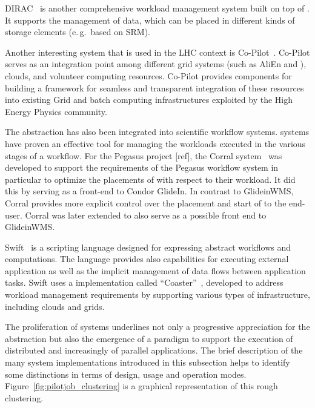 \documentclass{sig-alternate}
\begin{document}
DIRAC~\cite{1742-6596-219-6-062049} is another comprehensive workload management
system built on top of \pilots. It supports the management of data, which can be
placed in different kinds of storage elements (e.\,g.\ based on SRM).

Another interesting \pilot system that is used in the LHC context is
Co-Pilot~\cite{copilot-tr}. Co-Pilot serves as an integration point among
different grid \pilot systems (such as AliEn and \panda), clouds, and volunteer
computing resources. Co-Pilot provides components for building a framework for
seamless and transparent integration of these resources into existing Grid and
batch computing infrastructures exploited by the High Energy Physics community.

The \pilot abstraction has also been integrated into scientific workflow
systems. \pilot systems have proven an effective tool for managing the workloads
executed in the various stages of a workflow. For the Pegasus project [ref], the
Corral system~\cite{Rynge:2011:EUG:2116259.2116599} was developed to support the
requirements of the Pegasus workflow system in particular to optimize the
placements of \pilots with respect to their workload. It did this by serving as
a front-end to Condor GlideIn. In contrast to GlideinWMS, Corral provides more
explicit control over the placement and start of \pilots to the end-user. Corral
was later extended to also serve as a possible front end to GlideinWMS.

Swift~\cite{Wilde2011} is a scripting language designed for expressing abstract
workflows and computations. The language provides also capabilities for
executing external application as well as the implicit management of data flows
between application tasks. Swift uses a \pilot implementation called
``Coaster''~\cite{coasters}, developed to address workload management
requirements by supporting various types of infrastructure, including clouds and
grids.


The proliferation of \pilot systems underlines not only a progressive
appreciation for the \pilot abstraction but also the emergence of a \pilot
paradigm to support the execution of distributed and increasingly of parallel
applications. The brief description of the many \pilot system implementations
introduced in this subsection helps to identify some distinctions in terms of
design, usage and operation modes. Figure~\ref{fig:pilotjob_clustering} is a
graphical representation of this rough clustering.
\end{document}
